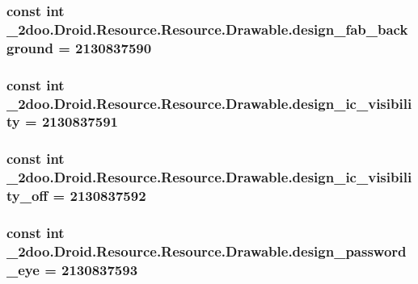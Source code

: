 \hypertarget{class__2doo_1_1_droid_1_1_resource_1_1_drawable_9a11c5a4f1e7bbe7cfdad609d707a8c6}{
\subsubsection[{design\_\-fab\_\-background}]{\setlength{\rightskip}{0pt plus 5cm}const int \_\-2doo.Droid.Resource.Resource.Drawable.design\_\-fab\_\-background = 2130837590}}
\label{class__2doo_1_1_droid_1_1_resource_1_1_drawable_9a11c5a4f1e7bbe7cfdad609d707a8c6}


\hypertarget{class__2doo_1_1_droid_1_1_resource_1_1_drawable_e2f71e19746bf0884a4f2f53ef477c92}{
\subsubsection[{design\_\-ic\_\-visibility}]{\setlength{\rightskip}{0pt plus 5cm}const int \_\-2doo.Droid.Resource.Resource.Drawable.design\_\-ic\_\-visibility = 2130837591}}
\label{class__2doo_1_1_droid_1_1_resource_1_1_drawable_e2f71e19746bf0884a4f2f53ef477c92}


\hypertarget{class__2doo_1_1_droid_1_1_resource_1_1_drawable_e7caeb0a362397b0a972e729a030e4cf}{
\subsubsection[{design\_\-ic\_\-visibility\_\-off}]{\setlength{\rightskip}{0pt plus 5cm}const int \_\-2doo.Droid.Resource.Resource.Drawable.design\_\-ic\_\-visibility\_\-off = 2130837592}}
\label{class__2doo_1_1_droid_1_1_resource_1_1_drawable_e7caeb0a362397b0a972e729a030e4cf}


\hypertarget{class__2doo_1_1_droid_1_1_resource_1_1_drawable_8780c9b522772baa3e67ea5e9f2cf40e}{
\subsubsection[{design\_\-password\_\-eye}]{\setlength{\rightskip}{0pt plus 5cm}const int \_\-2doo.Droid.Resource.Resource.Drawable.design\_\-password\_\-eye = 2130837593}}
\label{class__2doo_1_1_droid_1_1_resource_1_1_drawable_8780c9b522772baa3e67ea5e9f2cf40e}


